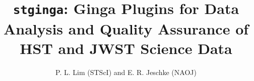 \documentclass[]{article}
\def\mypaperwidth{27.83in} \def\mypaperheight{39.37in}     %
\def\mydblmargin{\dimen87}
\begin{document}
\setlength{\textwidth}{\mypaperwidth-\mydblmargin}
\setlength{\textheight}{\mypaperheight-\mydblmargin}

\setlength{\hoffset}{-1.0in}
\setlength{\voffset}{-1.0in}

\setlength{\marginparwidth}{0in}
\setlength{\marginparsep}{0in}

\setlength{\footskip}{1em}

\setlength\headheight{0in}
\setlength\headsep{1em}

\setlength{\topmargin}{0.0in}
\setlength{\oddsidemargin}{1in}
\setlength{\evensidemargin}{1in}

\newcommand{\para}{\vspace*{1em}}

\title{{\tt stginga}: Ginga Plugins for Data Analysis and Quality Assurance of
            HST and JWST Science Data}
\author{P. L. Lim (STScI) and E. R. Jeschke (NAOJ)}

\setlength{\parindent}{0in}
\setlength{\parskip}{0pt}

\raggedright


\pagestyle{empty}
\end{document}
